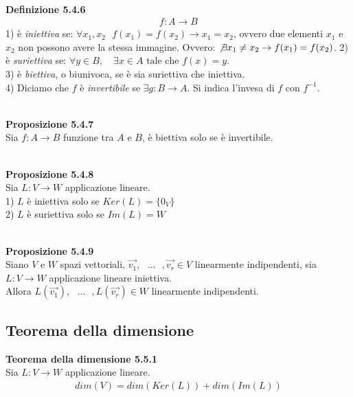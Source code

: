 \documentclass{article}
\begin{document}
\vspace{5px}
\textbf{\\Definizione 5.4.6}
\begin{align*}
  f : A\to B
\end{align*}
1) è \textit{iniettiva} se: $\forall x_1,x_2 \text{ }f(x_1)=f(x_2)\to x_1=x_2$, ovvero due elementi $x_1$ e $x_2$ non possono avere la stessa immagine. Ovvero: $\not\exists x_1 \neq x_2 \to f(x_1)=f(x_2)$.
2) è \textit{suriettiva} se: $\forall y \in B, \quad \exists x \in A \text{ tale che } f(x) = y.$ \\
3) è \textit{biettiva}, o biunivoca, se è sia suriettiva che iniettiva. \\
4) Diciamo che $f$ è \textit{invertibile} se $\exists g : B \to A$. Si indica l'invesa di $f$ con $f^{-1}$.

\vspace{5px}
\textbf{\\Proposizione 5.4.7}
\\Sia $f : A \to B$ funzione tra $A$ e $B$, è biettiva solo se è invertibile.

\vspace{5px}
\textbf{\\Proposizione 5.4.8}
\\Sia $L : V \to W$ applicazione lineare.
\\1) $L$ è iniettiva solo se $Ker(L)=\{0_V\}$
\\2) $L$ è suriettiva solo se $Im(L)=W$

\vspace{5px}
\textbf{\\Proposizione 5.4.9}
\\ Siano $V$ e $W$ spazi vettoriali, $\vec{v_1},\text{ }\dots\text{ },\vec{v_r} \in V$ linearmente indipendenti, sia $L : V \to W$ applicazione lineare iniettiva.
\\ Allora $L(\vec{v_1}),\text{ }\dots\text{ },L(\vec{v_r}) \in W$ linearmente indipendenti.

\vspace{2em}
\subsection{Teorema della dimensione}
\textbf{Teorema della dimensione 5.5.1}
\\Sia $L : V \to W$ applicazione lineare.
\begin{align*}
  dim(V)=dim(Ker(L))+dim(Im(L))
\end{align*}
\end{document}
